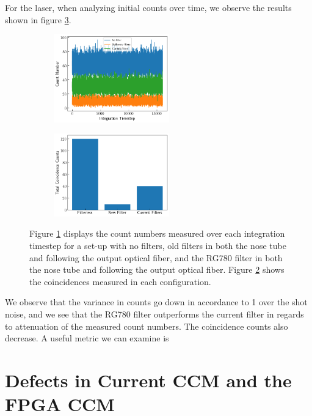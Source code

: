 \documentclass[letterpaper, 11 pt]{book}
\begin{document}
For the laser, when analyzing initial counts over time, we observe the results
shown in figure \ref{fig:filter_run}.
\begin{figure}[H]%
    \centering
    \begin{subfigure}{.4\textwidth}
    \includegraphics[width=5cm]{filter_ch1_laser.png}
    \caption{ }
    \label{fig:lch1}
    \end{subfigure}
    \begin{subfigure}{.4\textwidth}
    \includegraphics[width = 5cm]{filter_cc_laser.png}
    \caption{ }
    \label{fig:lcc}
    \end{subfigure}
    \caption{Figure \ref{fig:lch1} displays the count numbers measured over each
    integration timestep for a set-up with no filters, old filters in both the
    nose tube and following the output optical fiber, and the RG780 filter in
    both the nose tube and following the output optical fiber. Figure
    \ref{fig:lcc} shows the coincidences measured in each configuration.}
    \label{fig:filter_run}
\end{figure}
We observe that the variance in counts go down in accordance to 1 over the shot
noise, and we see that the RG780 filter outperforms the current filter in
regards to attenuation of the measured count numbers. The coincidence counts
also decrease. A useful metric we can examine is
\section{Defects in Current CCM and the FPGA CCM}
\newpage

%

\end{document}
